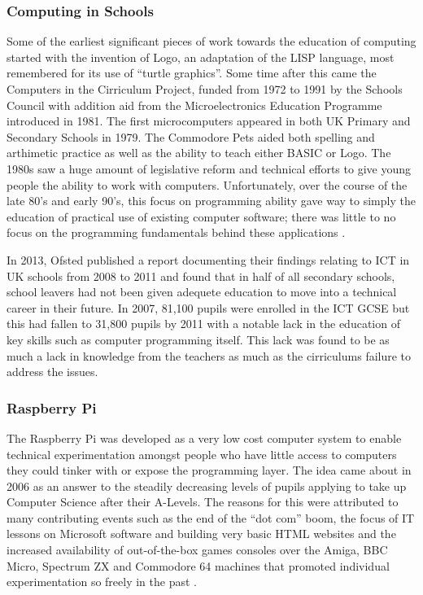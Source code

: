 \documentclass[11pt, abstracton, twoside, titlepage=true]{scrartcl}
\begin{document}
\subsubsection{Computing in Schools}
Some of the earliest significant pieces of work towards the 
education of computing started with the invention of Logo, an adaptation of 
the LISP language, most remembered for its use of ``turtle graphics''. Some 
time after this came the Computers in the Cirriculum Project, funded from 
1972 to 1991 by the Schools Council with addition aid from the Microelectronics 
Education Programme introduced in 1981. The first microcomputers appeared in 
both UK Primary and Secondary Schools in 1979. The Commodore Pets aided both 
spelling and arthimetic practice as well as the ability to teach either BASIC or 
Logo. The 1980s saw a huge amount of legislative reform and technical efforts 
to give young people the ability to work with computers. Unfortunately, over the 
course of the late 80's and early 90's, this focus on programming ability gave 
way to simply the education of practical use of existing computer software; 
there was little to no focus on the programming fundamentals behind 
these applications \cite{naec}.

In 2013, Ofsted published a report documenting their findings relating to ICT 
in UK schools from 2008 to 2011 and found that in half of all secondary 
schools, school leavers had not been given adequete education to move into a 
technical career in their future. In 2007, 81,100 pupils were enrolled in the 
ICT GCSE but this had fallen to 31,800 pupils by 2011 \cite{DfEO13} with a 
notable lack in the education of key skills such as computer programming 
itself. This lack was found to be as much a lack in knowledge from the 
teachers as much as the cirriculums failure to address the issues.

\subsubsection{Raspberry Pi}
The Raspberry Pi was developed as a very low cost computer system to enable 
technical experimentation amongst people who have little access to computers 
they could tinker with or expose the programming layer. The idea came about in 
2006 as an answer to the steadily decreasing levels of pupils applying to take 
up Computer Science after their A-Levels. The reasons for this were attributed 
to many contributing events such as the end of the ``dot com'' boom, the focus 
of IT lessons on Microsoft software and building very basic HTML websites and 
the increased availability of out-of-the-box games consoles over the Amiga, BBC 
Micro, Spectrum ZX and Commodore 64 machines that promoted individual 
experimentation so freely in the past \cite{rp}.
\end{document}
